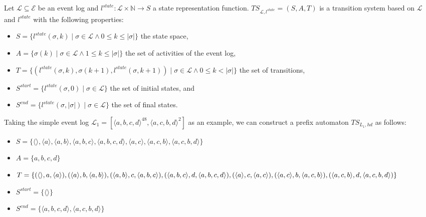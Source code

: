 \begin{definition}\label{def:pa}

    Let $\mathcal{L} \subseteq \mathcal{E}$ be an event log and $l^{state} \colon \mathcal{L} \times \mathbb{N} \rightarrow S$ a state representation function. $\mathit{TS}_{\mathcal{L}, l^{state}} = (S, A, T)$ is a transition system based on $\mathcal{L}$ and $l^{state}$ with the following properties:
    
    \begin{itemize}
        \item $S = \{l^{state}(\sigma, k) \mid \sigma \in \mathcal{L} \land 0 \leq k \leq \lvert \sigma \rvert \}$ the state space,
        \item $A = \{ \sigma(k) \mid \sigma \in \mathcal{L} \land 1 \leq k \leq \lvert \sigma \rvert \}$ the set of activities of the event log,
        \item $T = \{ (l^{state}(\sigma, k), \sigma(k+1), l^{state}(\sigma, k+1)) \mid \sigma \in \mathcal{L} \land 0 \leq k < \lvert \sigma \rvert \}$ the set of transitions,
        \item $S^{start} = \{ l^{state}(\sigma, 0) \mid \sigma \in \mathcal{L} \}$ the set of initial states, and
        \item $S^{end} = \{ l^{state}(\sigma, \lvert \sigma \rvert) \mid \sigma \in \mathcal{L} \}$ the set of final states.
    \end{itemize} 

\end{definition}

Taking the simple event log $\mathcal{L}_1 = [ \langle a, b, c, d \rangle ^{48}, \langle a, c, b, d \rangle^2 ]$ as an example, we can construct a prefix automaton $\mathit{TS}_{L_1, hd}$ as follows:

\begin{itemize}
    \item $S = \{ \langle \rangle, \langle a \rangle, \langle a, b \rangle, \langle a, b, c \rangle, \langle a, b, c, d \rangle, \langle a, c \rangle, \langle a, c, b \rangle, \langle a, c, b, d \rangle \}$
    \item $A = \{ a, b, c, d \}$
    \item $T = \{ (\langle \rangle, a, \langle a \rangle), (\langle a \rangle, b, \langle a, b \rangle), (\langle a, b \rangle, c, \langle a, b, c \rangle), (\langle a, b, c \rangle, d, \langle a, b, c, d \rangle), (\langle a \rangle, c, \langle a, c \rangle), \\ (\langle a, c \rangle, b, \langle a, c, b \rangle), (\langle a, c, b \rangle, d, \langle a, c, b, d \rangle) \}$
    \item $S^{start} = \{ \langle \rangle \}$
    \item $S^{end} = \{ \langle a, b, c, d \rangle, \langle a, c, b, d \rangle \}$
\end{itemize}


